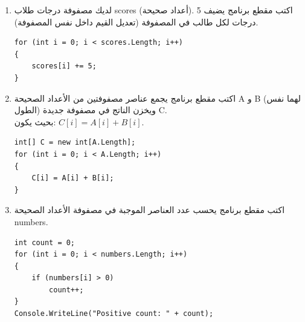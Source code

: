 \documentclass[14pt]{extarticle}
\begin{document}
\begin{enumerate}[itemsep=2em]
    \item
    لديك مصفوفة درجات طلاب \textenglish{scores} (أعداد صحيحة). اكتب مقطع برنامج يضيف 5 درجات لكل طالب في المصفوفة (تعديل القيم داخل نفس المصفوفة).
    \ifwithsols
    \begin{boxSolution}
    \begin{english}
    \begin{verbatim}
for (int i = 0; i < scores.Length; i++)
{
    scores[i] += 5;
}
    \end{verbatim}
    \end{english}
    \end{boxSolution}
    \fi

    \item
    اكتب مقطع برنامج يجمع عناصر مصفوفتين من الأعداد الصحيحة \textenglish{A} و \textenglish{B} (لهما نفس الطول) ويخزن الناتج في مصفوفة جديدة \textenglish{C}.\\
    بحيث يكون: $C[i] = A[i] + B[i]$.
    \ifwithsols
    \begin{boxSolution}
    \begin{english}
    \begin{verbatim}
int[] C = new int[A.Length];
for (int i = 0; i < A.Length; i++)
{
    C[i] = A[i] + B[i];
}
    \end{verbatim}
    \end{english}
    \end{boxSolution}
    \fi

    \item
    اكتب مقطع برنامج يحسب عدد العناصر الموجبة في مصفوفة الأعداد الصحيحة \textenglish{numbers}.
    \ifwithsols
    \begin{boxSolution}
    \begin{english}
    \begin{verbatim}
int count = 0;
for (int i = 0; i < numbers.Length; i++)
{
    if (numbers[i] > 0)
        count++;
}
Console.WriteLine("Positive count: " + count);
    \end{verbatim}
    \end{english}
    \end{boxSolution}
    \fi


\end{enumerate}
\end{document}
